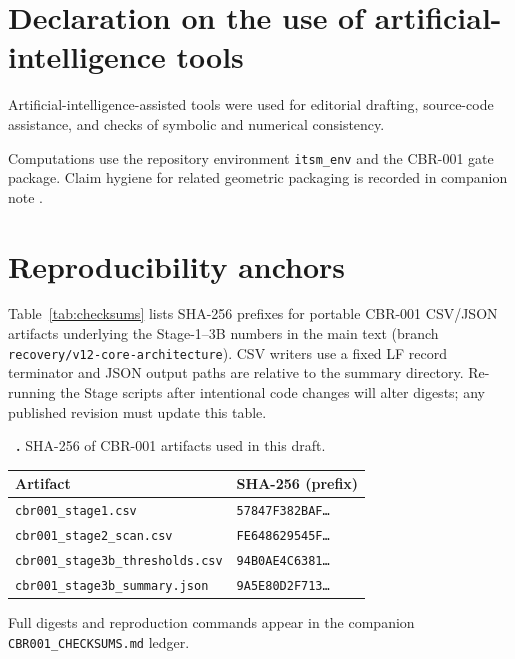 \documentclass[aps,prd,reprint,superscriptaddress,nofootinbib,floatfix,showkeys]{revtex4-2}
\begin{document}
\section*{Declaration on the use of artificial-intelligence tools}

Artificial-intelligence-assisted tools were used for editorial drafting,
source-code assistance, and checks of symbolic and numerical consistency.

\begin{acknowledgments}
Computations use the repository environment \texttt{itsm\_env} and the
CBR-001 gate package.
Claim hygiene for related geometric packaging is recorded in companion note
\cite{boyd_p1}.
\end{acknowledgments}

\appendix

\section{Reproducibility anchors}
\label{app:checksums}

Table~\ref{tab:checksums} lists SHA-256 prefixes for portable CBR-001 CSV/JSON
artifacts underlying the Stage-1--3B numbers in the main text (branch
\texttt{recovery/v12-core-architecture}).  CSV writers use a fixed LF record
terminator and JSON output paths are relative to the summary directory.
Re-running the Stage scripts after intentional code changes will alter digests;
any published revision must update this table.

\begin{center}
\label{tab:checksums}
\small
\textbf{\MakeUppercase{\tablename}~\thetable.} SHA-256 of CBR-001 artifacts
used in this draft.
\par\smallskip
\begin{ruledtabular}
\begin{tabular}{ll}
Artifact & SHA-256 (prefix) \\
\hline
\texttt{cbr001\_stage1.csv} & \texttt{57847F382BAF\ldots} \\
\texttt{cbr001\_stage2\_scan.csv} & \texttt{FE648629545F\ldots} \\
\texttt{cbr001\_stage3b\_thresholds.csv} & \texttt{94B0AE4C6381\ldots} \\
\texttt{cbr001\_stage3b\_summary.json} & \texttt{9A5E80D2F713\ldots} \\
\end{tabular}
\end{ruledtabular}
\end{center}

Full digests and reproduction commands appear in the companion
\texttt{CBR001\_CHECKSUMS.md} ledger.


\end{document}

